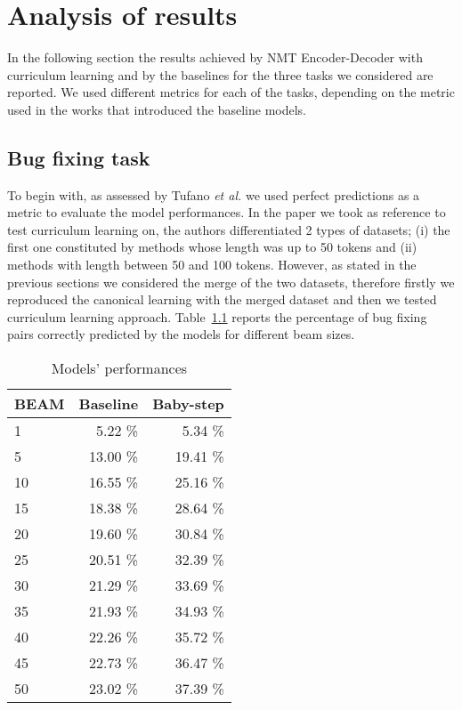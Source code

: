 \chapter{Analysis of results}
In the following section the results 
achieved by NMT Encoder-Decoder with curriculum learning and
by the baselines for the three tasks we considered are reported.
We used different metrics for each of the tasks, depending on the metric used in the works
that introduced the baseline models.

\section{Bug fixing task}
To begin with, as assessed by Tufano \textit{et al.} \cite{Tufano2019} we used 
perfect predictions as a metric to evaluate the model performances. In the paper we took as reference
to test curriculum learning on, the authors differentiated 2 types of datasets; (i) the first one constituted by methods
whose length was up to 50 tokens and (ii) methods with length between 50 and 100 tokens. 
However, as stated in the previous sections
we considered the merge of the two datasets, 
therefore firstly we reproduced the canonical learning with the merged dataset and then we tested curriculum learning
approach.
Table~\ref{table:pp_bugfixing} reports the percentage %
of bug fixing pairs correctly predicted
by the models for different beam sizes.
\begin{table}[h!]
    \centering
    \begin{tabular}{l|r|r}
    BEAM & Baseline & Baby-step\\ [0.5ex]
    \hline 
    1 & 5.22 \% & 5.34 \%\\ 
    5 & 13.00 \% & 19.41 \%\\
    10 & 16.55 \% & 25.16 \%\\
    15 & 18.38 \% & 28.64 \%\\
    20 & 19.60 \% & 30.84 \%\\
    25 & 20.51 \% & 32.39 \%\\
    30 & 21.29 \% & 33.69 \%\\
    35 & 21.93 \% & 34.93 \%\\
    40 & 22.26 \% & 35.72 \%\\
    45 & 22.73 \% & 36.47 \%\\
    50 & 23.02 \% & 37.39 \%\\ [1ex]
    \end{tabular}
    \caption{Models' performances}
    \label{table:pp_bugfixing}
\end{table}
